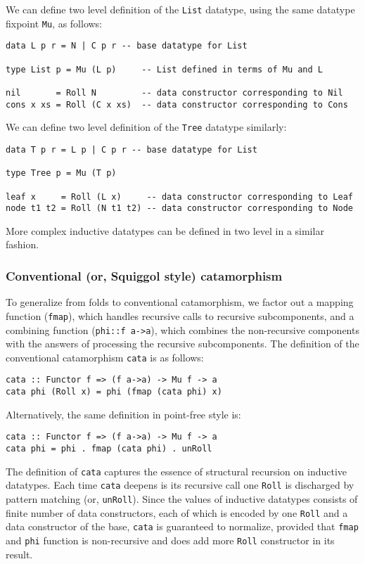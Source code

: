 We can define two level definition of the \texttt{List} datatype,
using the same datatype fixpoint \texttt{Mu}, as follows:
\begin{verbatim}
data L p r = N | C p r -- base datatype for List

type List p = Mu (L p)     -- List defined in terms of Mu and L

nil       = Roll N         -- data constructor corresponding to Nil
cons x xs = Roll (C x xs)  -- data constructor corresponding to Cons
\end{verbatim}
We can define two level definition of the \texttt{Tree} datatype similarly:
\begin{verbatim}
data T p r = L p | C p r -- base datatype for List

type Tree p = Mu (T p)

leaf x     = Roll (L x)     -- data constructor corresponding to Leaf
node t1 t2 = Roll (N t1 t2) -- data constructor corresponding to Node
\end{verbatim}
More complex inductive datatypes can be defined in two level
in a similar fashion.

\subsubsection{Conventional (or, Squiggol style) catamorphism}
\label{sssec:cata}
To generalize from folds to conventional catamorphism, we factor out
a mapping function (\texttt{fmap}),
which handles recursive calls to recursive subcomponents, and
a combining function (\texttt{phi::f a->a}), which combines
the non-recursive components with the answers of processing
the recursive subcomponents. The definition of the conventional catamorphism
\texttt{cata} is as follows:
\begin{verbatim}
cata :: Functor f => (f a->a) -> Mu f -> a 
cata phi (Roll x) = phi (fmap (cata phi) x)
\end{verbatim}
Alternatively, the same definition in point-free style is:
\begin{verbatim}
cata :: Functor f => (f a->a) -> Mu f -> a 
cata phi = phi . fmap (cata phi) . unRoll
\end{verbatim}
The definition of \texttt{cata} captures the essence of structural recursion
on inductive datatypes. Each time \texttt{cata} deepens is its recursive call
one \texttt{Roll} is discharged by pattern matching (or, \texttt{unRoll}).
Since the values of inductive datatypes consists of finite number of
data constructors, each of which is encoded by one \texttt{Roll} and
a data constructor of the base, \texttt{cata} is guaranteed to normalize,
provided that \texttt{fmap} and \texttt{phi} function is non-recursive and
does add more \texttt{Roll} constructor in its result.

